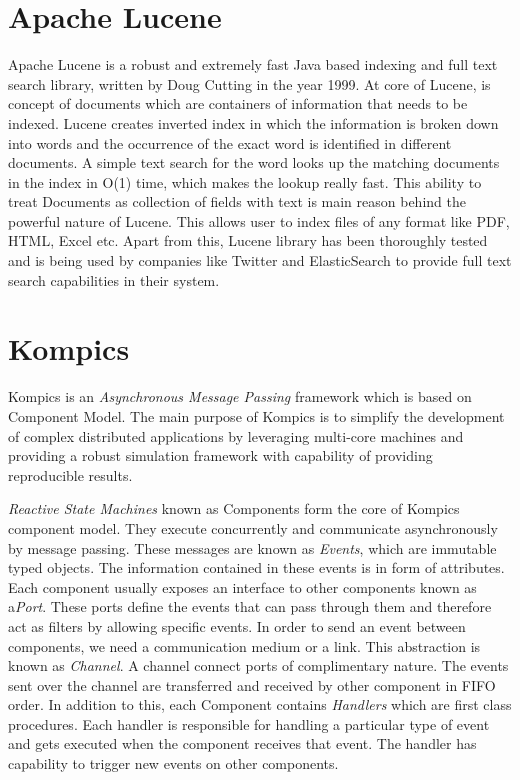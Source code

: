\documentclass[a4paper,11pt]{kth-mag}
\begin{document}
\section{Apache Lucene}

Apache Lucene \cite{lucene} is a robust and extremely fast Java based indexing and full text search library, written by Doug Cutting in the year 1999. At core of Lucene, is concept of documents which are containers of information that needs to be indexed. Lucene creates inverted index in which the information is broken down into words and the occurrence of the exact word is identified in different documents. A simple text search for the word looks up the matching documents in the index in O(1) time, which makes the lookup really fast. This ability to treat Documents as collection of fields with text is main reason behind the powerful nature of Lucene. This allows user to index files of any format like PDF, HTML, Excel etc.
Apart from this, Lucene library has been thoroughly tested and is being used by companies like Twitter and ElasticSearch \cite{elasticsearch} to provide full text search capabilities in their system.

\section{Kompics}
Kompics \cite{kompics} is an \textit{Asynchronous Message Passing} framework which is based on Component Model. The main purpose of Kompics is to simplify the development of complex distributed applications by leveraging multi-core machines and providing a robust simulation framework with capability of providing reproducible results.
\par \textit{Reactive State Machines} known as Components form the core of Kompics component model. They execute concurrently and communicate asynchronously by message passing. These messages are known as \textit{Events}, which are immutable typed objects. The information contained in these events is in form of attributes. Each component usually exposes an interface to other components known as a\textit{Port}. These ports define the events that can pass through them and therefore act as filters by allowing specific events. In order to send an event between components, we need a communication medium or a link. This abstraction is known as \textit{Channel}. A channel connect ports of complimentary nature. The events sent over the channel are transferred and received by other component in FIFO order. In addition to this, each Component contains \textit{Handlers} which are first class procedures. Each handler is responsible for handling a particular type of event and gets executed when the component receives that event. The handler has capability to trigger new events on other components.
\end{document}
